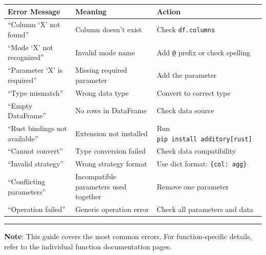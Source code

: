 \documentclass[
  letterpaper,
]{scrbook}
\begin{document}
\begin{longtable}[]{@{}
  >{\raggedright\arraybackslash}p{}
  >{\raggedright\arraybackslash}p{}
  >{\raggedright\arraybackslash}p{}@{}}
\toprule\noalign{}
\begin{minipage}[b]{\linewidth}\raggedright
Error Message
\end{minipage} & \begin{minipage}[b]{\linewidth}\raggedright
Meaning
\end{minipage} & \begin{minipage}[b]{\linewidth}\raggedright
Action
\end{minipage} \\
\midrule\noalign{}
\endhead
\bottomrule\noalign{}
\endlastfoot
``Column `X' not found'' & Column doesn't exist & Check
\texttt{df.columns} \\
``Mode `X' not recognized'' & Invalid mode name & Add \texttt{@} prefix
or check spelling \\
``Parameter `X' is required'' & Missing required parameter & Add the
parameter \\
``Type mismatch'' & Wrong data type & Convert to correct type \\
``Empty DataFrame'' & No rows in DataFrame & Check data source \\
``Rust bindings not available'' & Extension not installed & Run
\texttt{pip\ install\ additory{[}rust{]}} \\
``Cannot convert'' & Type conversion failed & Check data
compatibility \\
``Invalid strategy'' & Wrong strategy format & Use dict format:
\texttt{\{\textquotesingle{}col\textquotesingle{}:\ \textquotesingle{}agg\textquotesingle{}\}} \\
``Conflicting parameters'' & Incompatible parameters used together &
Remove one parameter \\
``Operation failed'' & Generic operation error & Check all parameters
and data \\
\end{longtable}

\begin{center}\rule{0.5\linewidth}{0.5pt}\end{center}

\textbf{Note}: This guide covers the most common errors. For
function-specific details, refer to the individual function
documentation pages.
\end{document}
